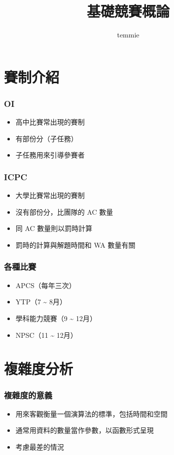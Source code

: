 \documentclass[mathserif]{beamer}
\title{基礎競賽概論}
\author{temmie}
\date{}
\begin{document}
\begin{frame}
    \titlepage
\end{frame}

\begin{frame}
    \tableofcontents
\end{frame}

\section{賽制介紹}

\begin{frame}
    \frametitle{OI}
    \begin{itemize}
        \item 高中比賽常出現的賽制
        \item 有部份分（子任務）
        \item 子任務用來引導參賽者
    \end{itemize}
\end{frame}

\begin{frame}
    \frametitle{ICPC}
    \begin{itemize}
        \item 大學比賽常出現的賽制
        \item 沒有部份分，比團隊的 AC 數量
        \item<2-> 同 AC 數量則以罰時計算
        \item<2-> 罰時的計算與解題時間和 WA 數量有關
    \end{itemize}
\end{frame}

\begin{frame}
    \frametitle{各種比賽}
    \begin{itemize}
        \item APCS（每年三次）
        \item YTP（7 \~{} 8月）
        \item 學科能力競賽（9 \~{} 12月）
        \item NPSC（11 \~{} 12月）
    \end{itemize}
\end{frame}

\section{複雜度分析}

\begin{frame}
    \frametitle{複雜度的意義}
    \begin{itemize}
        \item 用來客觀衡量一個演算法的標準，包括時間和空間
        \item 通常用資料的數量當作參數，以函數形式呈現
        \item 考慮最差的情況
    \end{itemize}
\end{frame}
\end{document}
